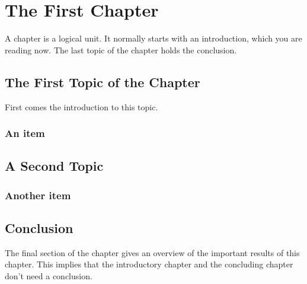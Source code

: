 \chapter{The First Chapter}
\label{cha:1}
A chapter is a logical unit. It normally starts with an introduction, which
you are reading now. The last topic of the chapter holds the conclusion.

\section{The First Topic of the Chapter}
First comes the introduction to this topic.

\subsection{An item}

\section{A Second Topic}

\subsection{Another item}

\section{Conclusion}
The final section of the chapter gives an overview of the important results
of this chapter. This implies that the introductory chapter and the
concluding chapter don't need a conclusion.
